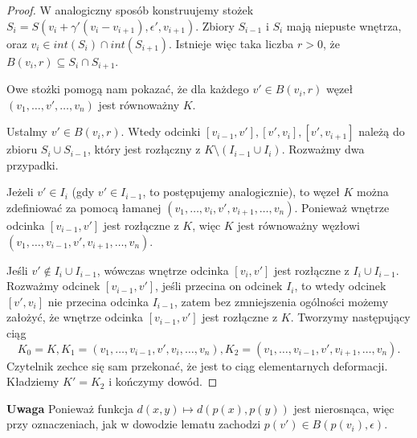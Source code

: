 \begin{proof}
W analogiczny sposób konstruujemy stożek $S_i = S(v_i + \gamma'(v_i - v_{i+1}), \epsilon', v_{i+1})$. Zbiory $S_{i-1}$ i $S_i$ mają niepuste wnętrza, oraz 
$v_i\in int(S_i)\cap int(S_{i+1})$. Istnieje więc taka liczba $r>0$, że $B(v_i, r)\subseteq S_i\cap S_{i+1}$.

Owe stożki pomogą nam pokazać, że dla każdego $v'\in B(v_i, r)$ węzeł $(v_1, \ldots, v', \ldots, v_n)$ jest równoważny $K$.

Ustalmy $v'\in B(v_i, r)$. Wtedy odcinki $[v_{i-1}, v'], [v',v_i], [v', v_{i+1}]$ należą do zbioru $S_i\cup S_{i-1}$, który jest rozłączny z $K\setminus(I_{i-1}\cup I_i)$. 
Rozważmy dwa przypadki. 

Jeżeli $v'\in I_i$ (gdy $v'\in I_{i-1}$, to postępujemy analogicznie), to węzeł $K$ można zdefiniować za pomocą łamanej $(v_1, \ldots, v_i, v', v_{i+1}, \ldots, v_n)$. Ponieważ
wnętrze odcinka $[v_{i-1}, v']$ jest rozłączne z $K$, więc $K$ jest równoważny węzłowi $(v_1, \ldots, v_{i-1}, v', v_{i+1}, \ldots, v_n)$.

Jeśli $v'\not\in I_i\cup I_{i-1}$, wówczas wnętrze odcinka $[v_i, v']$ jest rozłączne z $I_i\cup I_{i-1}$. Rozważmy odcinek $[v_{i-1}, v']$, jeśli przecina on odcinek $I_i$, to 
wtedy odcinek $[v', v_i]$ nie przecina odcinka $I_{i-1}$, zatem bez zmniejszenia ogólności możemy założyć, że wnętrze odcinka $[v_{i-1}, v']$ jest rozłączne z $K$. Tworzymy
następujący ciąg
\begin{displaymath}
 K_0 = K, K_1 = (v_1,\ldots, v_{i-1}, v', v_i, \ldots, v_n), K_2 = (v_1,\ldots, v_{i-1}, v', v_{i+1}, \ldots, v_n).
\end{displaymath}
Czytelnik zechce się sam przekonać, że jest to ciąg elementarnych deformacji. 
Kładziemy $K' = K_2$ i kończymy dowód.
\end{proof}
\textbf{Uwaga} Ponieważ funkcja
 $ d(x,y)\mapsto d(p(x), p(y))$ jest nierosnąca, więc przy oznaczeniach, jak w dowodzie lematu zachodzi $p(v')\in B(p(v_i),\epsilon)$.

